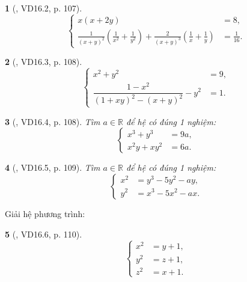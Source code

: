 \documentclass{article}
\newtheorem{baitoan}{}
\begin{document}
\begin{baitoan}[\cite{TLCT_THCS_Toan_9_dai_so}, VD16.2, p. 107]
	\begin{equation*}
		\left\{\begin{split}
			x(x + 2y) &= 8,\\
			\frac{1}{(x + y)^2}\left(\frac{1}{x^2} + \frac{1}{y^2}\right) + \frac{2}{(x + y)^3}\left(\frac{1}{x} + \frac{1}{y}\right) &= \frac{1}{16}.
		\end{split}\right.
	\end{equation*}
\end{baitoan}

\begin{baitoan}[\cite{TLCT_THCS_Toan_9_dai_so}, VD16.3, p. 108]
	\begin{equation*}
		\left\{\begin{split}
			x^2 + y^2 &= 9,\\
			\dfrac{1 - x^2}{(1 + xy)^2 - (x + y)^2} - y^2 &= 1.
		\end{split}\right.
	\end{equation*}
\end{baitoan}

\begin{baitoan}[\cite{TLCT_THCS_Toan_9_dai_so}, VD16.4, p. 108]
	Tìm $a\in\mathbb{R}$ để hệ có đúng 1 nghiệm:
	\begin{equation*}
		\left\{\begin{split}
			x^3 + y^3 &= 9a,\\
			x^2y + xy^2 &= 6a.
		\end{split}\right.
	\end{equation*}
\end{baitoan}

\begin{baitoan}[\cite{TLCT_THCS_Toan_9_dai_so}, VD16.5, p. 109]
	Tìm $a\in\mathbb{R}$ để hệ có đúng 1 nghiệm:
	\begin{equation*}
		\left\{\begin{split}
			x^2 &= y^3 - 5y^2 - ay,\\
			y^2 &= x^3 - 5x^2 - ax.
		\end{split}\right.
	\end{equation*}
\end{baitoan}
Giải hệ phương trình:

\begin{baitoan}[\cite{TLCT_THCS_Toan_9_dai_so}, VD16.6, p. 110]	
	\begin{equation*}
		\left\{\begin{split}
			x^2 &= y + 1,\\
			y^2 &= z + 1,\\
			z^2 &= x + 1.
		\end{split}\right.
	\end{equation*}
\end{baitoan}
\end{document}
